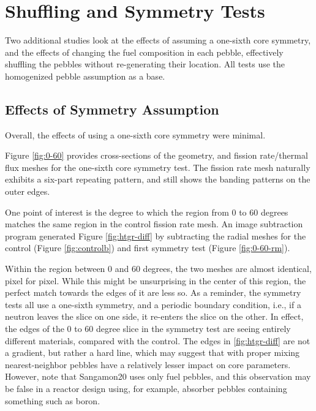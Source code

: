 \section{Shuffling and Symmetry Tests}
Two additional studies look at the effects of assuming a one-sixth core symmetry, and the effects of changing the fuel composition in each pebble, effectively shuffling the pebbles without re-generating their location.  All tests use the homogenized pebble assumption as a base.

\subsection{Effects of Symmetry Assumption}
\label{res-sym}

Overall, the effects of using a one-sixth core symmetry were minimal.




Figure \ref{fig:0-60} provides cross-sections of the geometry, and fission rate/thermal flux meshes for the one-sixth core symmetry test.  The fission rate mesh naturally exhibits a six-part repeating pattern, and still shows the banding patterns on the outer edges. 



One point of interest is the degree to which the region from 0 to 60 degrees matches the same region in the control fission rate mesh.  An image subtraction program generated Figure \ref{fig:htgr-diff} by subtracting the radial meshes for the control (Figure \ref{fig:controlb}) and first symmetry test (Figure \ref{fig:0-60-rm}).



Within the region between 0 and 60 degrees, the two meshes are almost identical, pixel for pixel.  While this might be unsurprising in the center of this region, the perfect match towards the edges of it are less so.  As a reminder, the symmetry tests all use a one-sixth symmetry, and a periodic boundary condition, i.e., if a neutron leaves the slice on one side, it re-enters the slice on the other.  In effect, the edges of the 0 to 60 degree slice in the symmetry test are seeing entirely different materials, compared with the control.  The edges in \ref{fig:htgr-diff} are not a gradient, but rather a hard line, which may suggest that with proper mixing nearest-neighbor pebbles have a relatively lesser impact on core parameters.  However, note that Sangamon20 uses only fuel pebbles, and this observation may be false in a reactor design using, for example, absorber pebbles containing something such as boron. 


